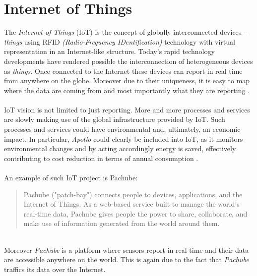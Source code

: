 \documentclass[12pt,a4paper]{report}
\begin{document}
\section{Internet of Things}
The \textit{Internet of Things} (IoT) is the concept of globally interconnected devices -- \textit{things} using RFID \textit{(Radio-Frequency IDentification)} technology with virtual representation in an Internet-like structure.
Today's rapid technology developments have rendered possible the interconnection of heterogeneous devices as \textit{things}.
Once connected to the Internet these devices can report in real time from anywhere on the globe.
Moreover due to their uniqueness, it is easy to map where the data are coming from and most importantly what they are reporting \cite{website:iot}.\\
\ \\
IoT vision is not limited to just reporting.
More and more processes and services are slowly making use of the global infrastructure provided by IoT.
Such processes and services could have environmental and, ultimately, an economic impact. 
In particular, \emph{Apollo} could clearly be included into IoT, as it monitors environmental changes and by acting accordingly energy is saved, effectively contributing to cost reduction in terms of annual consumption \cite{iotconference}.\\
\ \\
An example of such IoT project is Pachube:
\begin{quote} 
    Pachube ("patch-bay") connects people to devices, applications, and the Internet of Things. As a web-based service built to manage the world's real-time data, Pachube gives people the power to share, collaborate, and make use of information generated from the world around them. \cite{website:pachube}
\end{quote}
\ \\
Moreover \textit{Pachube} is a platform where sensors report in real time and their data are accessible anywhere on the world. 
This is again due to the fact that \textit{Pachube} traffics its data over the Internet.
%
\end{document}
